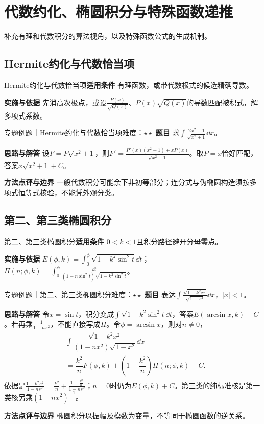 \section{代数约化、椭圆积分与特殊函数递推}\label{mat:advanced_integral_algebra}
\begin{examtip}补充有理和代数积分的算法视角，以及特殊函数公式的生成机制。\end{examtip}
\subsection{Hermite约化与代数恰当项}\label{mat:advanced_integral_algebra:hermite}
\begin{method}{Hermite约化与代数恰当项}\textbf{适用条件} 有理函数，或带代数根式的候选精确导数。\par\textbf{实施与依据} 先消高次极点，或设$\frac{P(x)}{\sqrt{Q(x)}}$、$P(x)\sqrt{Q(x)}$的导数匹配被积式，解多项式系数。\end{method}
\begin{example}{专题例题｜Hermite约化与代数恰当项}{难度：$\star\star$}
\textbf{题目} 求$\int\frac{2x^2+1}{\sqrt{x^2+1}}\dd x$。\par\textbf{思路与解答} 设$F=P\sqrt{x^2+1}$，则$F\prime=\frac{P\prime(x)(x^2+1)+xP(x)}{\sqrt{x^2+1}}$。取$P=x$恰好匹配，答案$x\sqrt{x^2+1}+C$。\par\textbf{方法点评与边界} 一般代数积分可能余下非初等部分；连分式与伪椭圆构造须按多项式恒等式核验，不能凭外观分类。
\end{example}
\subsection{第二、第三类椭圆积分}\label{mat:advanced_integral_algebra:elliptic23}
\begin{method}{第二、第三类椭圆积分}\textbf{适用条件} $0<k<1$且积分路径避开分母零点。\par\textbf{实施与依据} $E(\phi,k)=\int_0^\phi\sqrt{1-k^2\sin^2t}\dd t$；$\Pi(n;\phi,k)=\int_0^\phi\frac{\dd t}{(1-n\sin^2t)\sqrt{1-k^2\sin^2t}}$。\end{method}
\begin{example}{专题例题｜第二、第三类椭圆积分}{难度：$\star\star$}
\textbf{题目} 表达$\int\frac{\sqrt{1-k^2x^2}}{\sqrt{1-x^2}}\dd x$，$|x|<1$。\par\textbf{思路与解答} 令$x=\sin t$，积分变成$\int\sqrt{1-k^2\sin^2t}\dd t$，答案$E(\arcsin x,k)+C$。若再乘$\frac{1}{1-nx^2}$，不能直接写成$\Pi$。令$\phi=\arcsin x$，则对$n\ne0$，
\[
\begin{aligned}
&\int\dfrac{\sqrt{1-k^2x^2}}{(1-nx^2)\sqrt{1-x^2}}\dd x\\
&=\dfrac{k^2}{n}F(\phi,k)
+\left(1-\dfrac{k^2}{n}\right)\Pi(n;\phi,k)+C.
\end{aligned}
\]
依据是$\frac{1-k^2s^2}{1-ns^2}=\frac{k^2}{n}+\frac{1-\frac{k^2}{n}}{1-ns^2}$；$n=0$时仍为$E(\phi,k)+C$。第三类的纯标准核是第一类核另乘$(1-nx^2)^{-1}$。\par\textbf{方法点评与边界} 椭圆积分以振幅及模数为变量，不等同于椭圆函数的逆关系。
\end{example}
